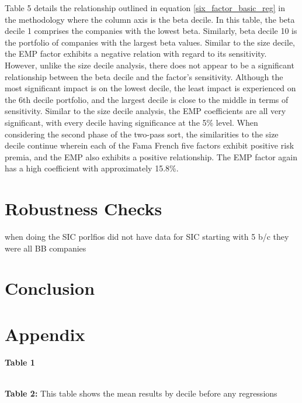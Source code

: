 \documentclass[12pt,oneside,reqno]{amsart}
\begin{document}
Table 5 details the relationship outlined in equation \eqref{six_factor_basic_reg} in the methodology where the column axis is the beta decile. In this table,  the beta decile 1 comprises the companies with the lowest beta. Similarly, beta decile 10 is the portfolio of companies with the largest beta values.  Similar to the size decile, the EMP factor exhibits a negative relation with regard to its sensitivity. However, unlike the size decile analysis, there does not appear to be a significant relationship between the beta decile and the factor's sensitivity. Although the most significant impact is on the lowest decile, the least impact is experienced on the 6th decile portfolio, and the largest decile is close to the middle in terms of sensitivity. Similar to the size decile analysis, the EMP coefficients are all very significant, with every decile having significance at the 5\% level. When considering the second phase of the two-pass sort, the similarities to the size decile continue wherein each of the Fama French five factors exhibit positive risk premia, and the EMP also exhibits a positive relationship. The EMP factor again has a high coefficient with approximately 15.8\%. 


\section{Robustness Checks}
when doing the SIC porlfios did not have data for SIC starting with 5 b/c they were all BB companies 
\label{Robustness}

\section{Conclusion}
\label{Conclusion}

{}

\singlespacing
{}

\section{Appendix}

 \begin{center}
     \textbf{Table 1}\\
 
 \end{center}
\\
\textbf{Table 2:} This table shows the mean results by decile before any regressions\\
\vspace{1cm}
\end{document}
